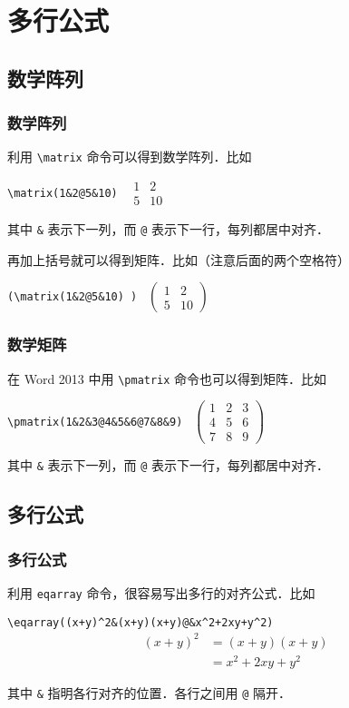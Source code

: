 \documentclass[12pt,notheorems,xcolor={rgb}]{beamer}
\let\lst=\lstinline
\newenvironment{framex}{\begin{frame}[fragile=singleslide,environment=framex]}{\end{frame}}
\begin{document}
\section{多行公式}

\subsection{数学阵列}

\begin{framex}
\frametitle{数学阵列}
利用 \lst!\matrix! 命令可以得到数学阵列．比如
\begin{exampleh}
\lst!\matrix(1&2@5&10) !
\tcblower
$\begin{array}{cc}
1 & 2 \\
5 & 10
\end{array}$
\end{exampleh}
其中 \lst!&! 表示下一列，而 \lst!@! 表示下一行，每列都居中对齐．\par
再加上括号就可以得到矩阵．比如（注意后面的两个空格符）
\begin{exampleh}
\lst!(\matrix(1&2@5&10) ) !
\tcblower
$\left(\begin{array}{cc}
1 & 2 \\
5 & 10
\end{array}\right)$
\end{exampleh}
\end{framex}

\begin{framex}
\frametitle{数学矩阵}
在 Word 2013 中用 \lst!\pmatrix! 命令也可以得到矩阵．比如
\begin{exampleh}[0.7]
\lst!\pmatrix(1&2&3@4&5&6@7&8&9) !
\tcblower
$\left(\begin{array}{ccc}
1 & 2 & 3 \\
4 & 5 & 6 \\
7 & 8 & 9
\end{array}\right)$
\end{exampleh}
其中 \lst!&! 表示下一列，而 \lst!@! 表示下一行，每列都居中对齐．
\end{framex}

\subsection{多行公式}

\begin{framex}
\frametitle{多行公式}
利用 \lst!eqarray! 命令，很容易写出多行的对齐公式．比如
\begin{examplev}
\lst!\eqarray((x+y)^2&(x+y)(x+y)@&x^2+2xy+y^2) !
\tcblower
\begin{align*}
(x+y)^2 &= (x+y)(x+y) \\
        &= x^2 + 2xy + y^2
\end{align*}
\end{examplev}
其中  \lst!&! 指明各行对齐的位置．各行之间用 \lst!@! 隔开．
\end{framex}
\end{document}
